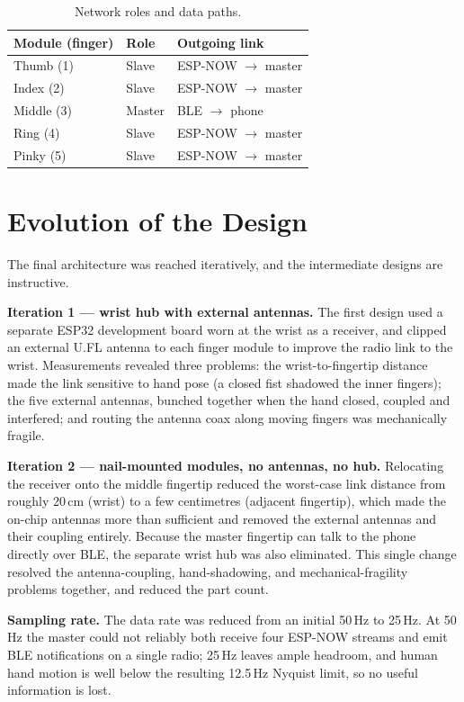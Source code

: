 \begin{table}[!htbp]
\centering
\caption{\label{tab:topology}Network roles and data paths.}
\begin{tabular}{lll}
\toprule
Module (finger) & Role & Outgoing link \\
\midrule
Thumb (1)  & Slave  & ESP-NOW $\rightarrow$ master \\
Index (2)  & Slave  & ESP-NOW $\rightarrow$ master \\
Middle (3) & Master & BLE $\rightarrow$ phone \\
Ring (4)   & Slave  & ESP-NOW $\rightarrow$ master \\
Pinky (5)  & Slave  & ESP-NOW $\rightarrow$ master \\
\bottomrule
\end{tabular}
\end{table}

\section{Evolution of the Design}

The final architecture was reached iteratively, and the intermediate designs
are instructive.

\textbf{Iteration 1 — wrist hub with external antennas.} The first design used
a separate ESP32 development board worn at the wrist as a receiver, and clipped
an external U.FL antenna to each finger module to improve the radio link to the
wrist. Measurements revealed three problems: the wrist-to-fingertip distance
made the link sensitive to hand pose (a closed fist shadowed the inner
fingers); the five external antennas, bunched together when the hand closed,
coupled and interfered; and routing the antenna coax along moving fingers was
mechanically fragile.

\textbf{Iteration 2 — nail-mounted modules, no antennas, no hub.} Relocating
the receiver onto the middle fingertip reduced the worst-case link distance
from roughly 20\,cm (wrist) to a few centimetres (adjacent fingertip), which
made the on-chip antennas more than sufficient and removed the external
antennas and their coupling entirely. Because the master fingertip can talk to
the phone directly over BLE, the separate wrist hub was also eliminated. This
single change resolved the antenna-coupling, hand-shadowing, and
mechanical-fragility problems together, and reduced the part count.

\textbf{Sampling rate.} The data rate was reduced from an initial 50\,Hz to
25\,Hz. At 50\,Hz the master could not reliably both receive four ESP-NOW
streams and emit BLE notifications on a single radio; 25\,Hz leaves ample
headroom, and human hand motion is well below the resulting 12.5\,Hz Nyquist
limit, so no useful information is lost.

